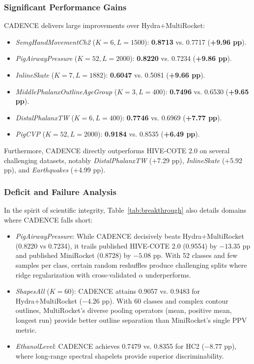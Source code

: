 \documentclass[journal,twocolumn]{article}
\begin{document}
\subsubsection{Significant Performance Gains}
CADENCE delivers large improvements over Hydra+MultiRocket:
\begin{itemize}
    \item \textit{SemgHandMovementCh2} ($K=6, L=1500$): \textbf{0.8713} vs. 0.7717 (\textbf{+9.96 pp}).
    \item \textit{PigAirwayPressure} ($K=52, L=2000$): \textbf{0.8220} vs. 0.7234 (\textbf{+9.86 pp}).
    \item \textit{InlineSkate} ($K=7, L=1882$): \textbf{0.6047} vs. 0.5081 (\textbf{+9.66 pp}).
    \item \textit{MiddlePhalanxOutlineAgeGroup} ($K=3, L=400$): \textbf{0.7496} vs. 0.6530 (\textbf{+9.65 pp}).
    \item \textit{DistalPhalanxTW} ($K=6, L=400$): \textbf{0.7746} vs. 0.6969 (\textbf{+7.77 pp}).
    \item \textit{PigCVP} ($K=52, L=2000$): \textbf{0.9184} vs. 0.8535 (\textbf{+6.49 pp}).
\end{itemize}
Furthermore, CADENCE directly outperforms HIVE-COTE 2.0 on several challenging datasets, notably \textit{DistalPhalanxTW} (+7.29 pp), \textit{InlineSkate} (+5.92 pp), and \textit{Earthquakes} (+4.99 pp).

\subsubsection{Deficit and Failure Analysis}
In the spirit of scientific integrity, Table~\ref{tab:breakthrough} also details domains where CADENCE falls short:
\begin{itemize}
    \item \textit{PigAirwayPressure}: While CADENCE decisively beats Hydra+MultiRocket (0.8220 vs 0.7234), it trails published HIVE-COTE 2.0 (0.9554) by $-13.35$ pp and published MiniRocket (0.8728) by $-5.08$ pp. With 52 classes and few samples per class, certain random reshuffles produce challenging splits where ridge regularization with cross-validated $\alpha$ underperforms.
    \item \textit{ShapesAll} ($K=60$): CADENCE attains 0.9057 vs. 0.9483 for Hydra+MultiRocket ($-4.26$ pp). With 60 classes and complex contour outlines, MultiRocket's diverse pooling operators (mean, positive mean, longest run) provide better outline separation than MiniRocket's single PPV metric.
    \item \textit{EthanolLevel}: CADENCE achieves 0.7479 vs. 0.8355 for HC2 ($-8.77$ pp), where long-range spectral shapelets provide superior discriminability.
\end{itemize}
\end{document}
